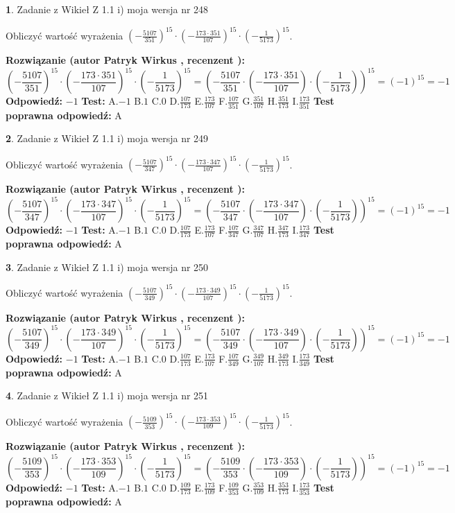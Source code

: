 \documentclass[12pt, a4paper]{article}
\theoremstyle{definition} %
\newtheorem{zad}{}
\newcommand{\zadStart}[1]{\begin{zad}#1\newline}
\newcommand{\zadStop}{\end{zad}}
\newcommand{\rozwStart}[2]{\noindent \textbf{Rozwiązanie (autor #1 , recenzent #2): }\newline}
\newcommand{\rozwStop}{\newline}
\newcommand{\odpStart}{\noindent \textbf{Odpowiedź:}\newline}
\newcommand{\odpStop}{\newline}
\newcommand{\testStart}{\noindent \textbf{Test:}\newline}
\newcommand{\testStop}{\newline}
\newcommand{\kluczStart}{\noindent \textbf{Test poprawna odpowiedź:}\newline}
\newcommand{\kluczStop}{\newline}
\begin{document}
\zadStart{Zadanie z Wikieł Z 1.1 i) moja wersja nr 248}

Obliczyć wartość wyrażenia $(-\frac{5107}{351})^{15} \cdot (-\frac{173 \cdot 351}{107})^{15} \cdot (-\frac{1}{5173})^{15}$.
\zadStop
\rozwStart{Patryk Wirkus}{}
$$(-\frac{5107}{351})^{15} \cdot (-\frac{173 \cdot 351}{107})^{15} \cdot (-\frac{1}{5173})^{15} = (-\frac{5107}{351} \cdot (-\frac{173 \cdot 351}{107}) \cdot (-\frac{1}{5173}))^{15} = (-1)^{15} = -1$$
\rozwStop
\odpStart
$-1$
\odpStop
\testStart
A.$-1$ B.$1$ C.$0$ D.$\frac{107}{173}$ E.$\frac{173}{107}$
F.$\frac{107}{351}$ G.$\frac{351}{107}$
H.$\frac{351}{173}$
I.$\frac{173}{351}$
\testStop
\kluczStart
A
\kluczStop



\zadStart{Zadanie z Wikieł Z 1.1 i) moja wersja nr 249}

Obliczyć wartość wyrażenia $(-\frac{5107}{347})^{15} \cdot (-\frac{173 \cdot 347}{107})^{15} \cdot (-\frac{1}{5173})^{15}$.
\zadStop
\rozwStart{Patryk Wirkus}{}
$$(-\frac{5107}{347})^{15} \cdot (-\frac{173 \cdot 347}{107})^{15} \cdot (-\frac{1}{5173})^{15} = (-\frac{5107}{347} \cdot (-\frac{173 \cdot 347}{107}) \cdot (-\frac{1}{5173}))^{15} = (-1)^{15} = -1$$
\rozwStop
\odpStart
$-1$
\odpStop
\testStart
A.$-1$ B.$1$ C.$0$ D.$\frac{107}{173}$ E.$\frac{173}{107}$
F.$\frac{107}{347}$ G.$\frac{347}{107}$
H.$\frac{347}{173}$
I.$\frac{173}{347}$
\testStop
\kluczStart
A
\kluczStop



\zadStart{Zadanie z Wikieł Z 1.1 i) moja wersja nr 250}

Obliczyć wartość wyrażenia $(-\frac{5107}{349})^{15} \cdot (-\frac{173 \cdot 349}{107})^{15} \cdot (-\frac{1}{5173})^{15}$.
\zadStop
\rozwStart{Patryk Wirkus}{}
$$(-\frac{5107}{349})^{15} \cdot (-\frac{173 \cdot 349}{107})^{15} \cdot (-\frac{1}{5173})^{15} = (-\frac{5107}{349} \cdot (-\frac{173 \cdot 349}{107}) \cdot (-\frac{1}{5173}))^{15} = (-1)^{15} = -1$$
\rozwStop
\odpStart
$-1$
\odpStop
\testStart
A.$-1$ B.$1$ C.$0$ D.$\frac{107}{173}$ E.$\frac{173}{107}$
F.$\frac{107}{349}$ G.$\frac{349}{107}$
H.$\frac{349}{173}$
I.$\frac{173}{349}$
\testStop
\kluczStart
A
\kluczStop



\zadStart{Zadanie z Wikieł Z 1.1 i) moja wersja nr 251}

Obliczyć wartość wyrażenia $(-\frac{5109}{353})^{15} \cdot (-\frac{173 \cdot 353}{109})^{15} \cdot (-\frac{1}{5173})^{15}$.
\zadStop
\rozwStart{Patryk Wirkus}{}
$$(-\frac{5109}{353})^{15} \cdot (-\frac{173 \cdot 353}{109})^{15} \cdot (-\frac{1}{5173})^{15} = (-\frac{5109}{353} \cdot (-\frac{173 \cdot 353}{109}) \cdot (-\frac{1}{5173}))^{15} = (-1)^{15} = -1$$
\rozwStop
\odpStart
$-1$
\odpStop
\testStart
A.$-1$ B.$1$ C.$0$ D.$\frac{109}{173}$ E.$\frac{173}{109}$
F.$\frac{109}{353}$ G.$\frac{353}{109}$
H.$\frac{353}{173}$
I.$\frac{173}{353}$
\testStop
\kluczStart
A
\kluczStop
\end{document}

